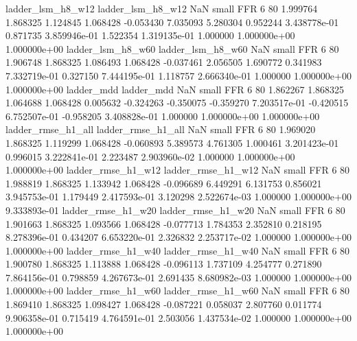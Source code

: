        ladder_lsm_h8_w12        ladder_lsm_h8_w12                   NaN      small      FFR                 6 80 1.999764       1.868325 1.124845       1.068428   -0.053430      7.035093      5.280304     0.952244   3.438778e-01  0.871735 3.859946e-01     1.522354   1.319135e-01            1.000000    1.000000e+00        1.000000e+00
       ladder_lsm_h8_w60        ladder_lsm_h8_w60                   NaN      small      FFR                 6 80 1.906748       1.868325 1.086493       1.068428   -0.037461      2.056505      1.690772     0.341983   7.332719e-01  0.327150 7.444195e-01     1.118757   2.666340e-01            1.000000    1.000000e+00        1.000000e+00
              ladder_mdd               ladder_mdd                   NaN      small      FFR                 6 80 1.862267       1.868325 1.064688       1.068428    0.005632     -0.324263     -0.350075    -0.359270   7.203517e-01 -0.420515 6.752507e-01    -0.958205   3.408828e-01            1.000000    1.000000e+00        1.000000e+00
      ladder_rmse_h1_all       ladder_rmse_h1_all                   NaN      small      FFR                 6 80 1.969020       1.868325 1.119299       1.068428   -0.060893      5.389573      4.761305     1.000461   3.201423e-01  0.996015 3.222841e-01     2.223487   2.903960e-02            1.000000    1.000000e+00        1.000000e+00
      ladder_rmse_h1_w12       ladder_rmse_h1_w12                   NaN      small      FFR                 6 80 1.988819       1.868325 1.133942       1.068428   -0.096689      6.449291      6.131753     0.856021   3.945753e-01  1.179449 2.417593e-01     3.120298   2.522674e-03            1.000000    1.000000e+00        9.333893e-01
      ladder_rmse_h1_w20       ladder_rmse_h1_w20                   NaN      small      FFR                 6 80 1.901663       1.868325 1.093566       1.068428   -0.077713      1.784353      2.352810     0.218195   8.278396e-01  0.434207 6.653220e-01     2.326832   2.253717e-02            1.000000    1.000000e+00        1.000000e+00
      ladder_rmse_h1_w40       ladder_rmse_h1_w40                   NaN      small      FFR                 6 80 1.900780       1.868325 1.113888       1.068428   -0.096113      1.737109      4.254777     0.271890   7.864156e-01  0.798859 4.267673e-01     2.691435   8.680982e-03            1.000000    1.000000e+00        1.000000e+00
      ladder_rmse_h1_w60       ladder_rmse_h1_w60                   NaN      small      FFR                 6 80 1.869410       1.868325 1.098427       1.068428   -0.087221      0.058037      2.807760     0.011774   9.906358e-01  0.715419 4.764591e-01     2.503056   1.437534e-02            1.000000    1.000000e+00        1.000000e+00
